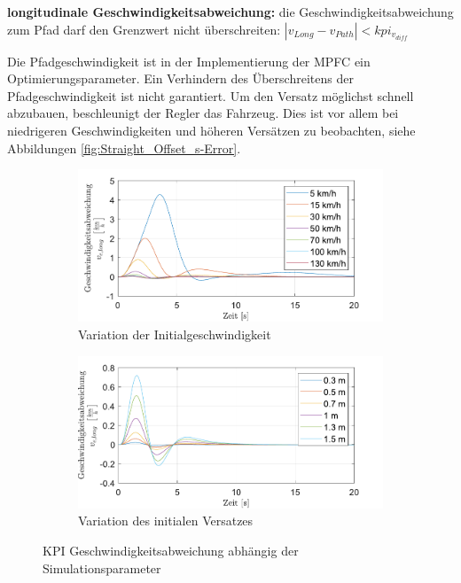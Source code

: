 \medskip\noindent\textbf{longitudinale Geschwindigkeitsabweichung:} die Geschwindigkeitsabweichung zum Pfad darf den Grenzwert nicht überschreiten: $|v_{Long} - v_{Path}| < kpi_{v_{diff}}$

\noindent Die Pfadgeschwindigkeit ist in der Implementierung der MPFC ein Optimierungsparameter. Ein Verhindern des Überschreitens der Pfadgeschwindigkeit ist nicht garantiert. Um den Versatz möglichst schnell abzubauen, beschleunigt der Regler das Fahrzeug. Dies ist vor allem bei niedrigeren Geschwindigkeiten und höheren Versätzen zu beobachten, siehe Abbildungen \ref{fig:Straight_Offset_s-Error}.   
\begin{figure}[ht]
    \centering
    \begin{subfigure}[b]{.49\textwidth}
        \centering
        \includegraphics[width=\textwidth]{figures/3_Implementierung/Straight_Offset/varVelo_1mOffset_v-Diff.pdf}
        \caption{Variation der Initialgeschwindigkeit}
        \label{fig:varVelo_1mOffset_v-Diff}
    \end{subfigure}
    \hfill
    \begin{subfigure}[b]{.49\textwidth}
        \centering
        \includegraphics[width=\textwidth]{figures/3_Implementierung/Straight_Offset/varOffset_50kmh_v-Diff.pdf}
        \caption{Variation des initialen Versatzes}
        \label{fig:varOffset_50kmh_v-Diff}
    \end{subfigure}
    \caption{KPI Geschwindigkeitsabweichung abhängig der Simulationsparameter}
    \label{fig:Straight_Offset_v-Diff}
\end{figure}

